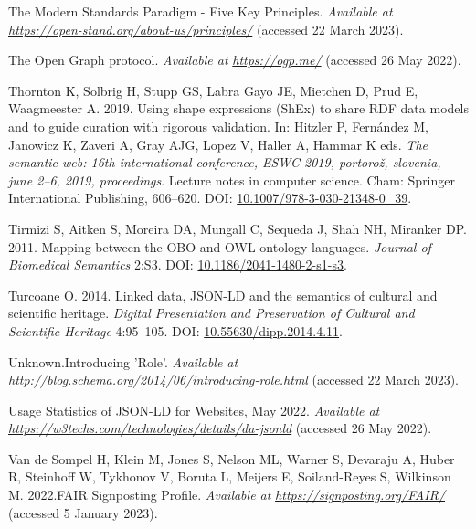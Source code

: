 \begin{CSLReferences}{1}{0}
\leavevmode{}%
The Modern Standards Paradigm - Five Key Principles. \emph{Available at} \href{https://open-stand.org/about-us/principles/}{\emph{https://open-stand.org/about-us/principles/}} (accessed 22 March 2023).

\leavevmode{}%
The Open Graph protocol. \emph{Available at} \href{https://ogp.me/}{\emph{https://ogp.me/}} (accessed 26 May 2022).

\leavevmode{}%
Thornton K, Solbrig H, Stupp GS, Labra Gayo JE, Mietchen D, Prud E, Waagmeester A. 2019. Using shape expressions (ShEx) to share RDF data models and to guide curation with rigorous validation. In: Hitzler P, Fernández M, Janowicz K, Zaveri A, Gray AJG, Lopez V, Haller A, Hammar K eds. \emph{The semantic web: 16th international conference, ESWC 2019, portorož, slovenia, june 2--6, 2019, proceedings}. Lecture notes in computer science. Cham: Springer International Publishing, 606--620. DOI: \href{https://doi.org/10.1007/978-3-030-21348-0_39}{10.1007/978-3-030-21348-0\_39}.

\leavevmode{}%
Tirmizi S, Aitken S, Moreira DA, Mungall C, Sequeda J, Shah NH, Miranker DP. 2011. Mapping between the OBO and OWL ontology languages. \emph{Journal of Biomedical Semantics} 2:S3. DOI: \href{https://doi.org/10.1186/2041-1480-2-s1-s3}{10.1186/2041-1480-2-s1-s3}.

\leavevmode{}%
Turcoane O. 2014. Linked data, JSON-LD and the semantics of cultural and scientific heritage. \emph{Digital Presentation and Preservation of Cultural and Scientific Heritage} 4:95--105. DOI: \href{https://doi.org/10.55630/dipp.2014.4.11}{10.55630/dipp.2014.4.11}.

\leavevmode{}%
Unknown.Introducing 'Role'. \emph{Available at} \href{http://blog.schema.org/2014/06/introducing-role.html}{\emph{http://blog.schema.org/2014/06/introducing-role.html}} (accessed 22 March 2023).

\leavevmode{}%
Usage Statistics of JSON-LD for Websites, May 2022. \emph{Available at} \href{https://w3techs.com/technologies/details/da-jsonld}{\emph{https://w3techs.com/technologies/details/da-jsonld}} (accessed 26 May 2022).

\leavevmode{}%
Van de Sompel H, Klein M, Jones S, Nelson ML, Warner S, Devaraju A, Huber R, Steinhoff W, Tykhonov V, Boruta L, Meijers E, Soiland-Reyes S, Wilkinson M. 2022.FAIR Signposting Profile. \emph{Available at} \href{https://signposting.org/FAIR/}{\emph{https://signposting.org/FAIR/}} (accessed 5 January 2023).


\end{CSLReferences}
